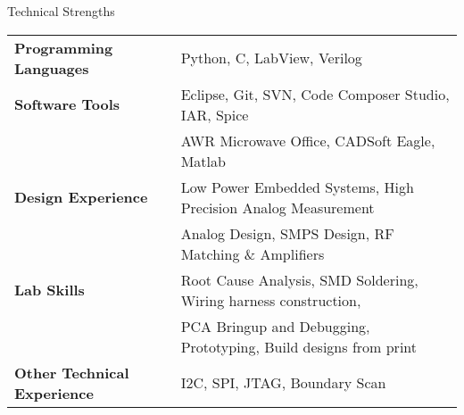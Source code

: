 \documentclass{resume} %
\begin{document}
\begin{rSection}{Technical Strengths}

\begin{tabular}{ @{} >{\bfseries}l @{\hspace{6ex}} l }
Programming Languages & Python, C, LabView, Verilog \smallskip \\

Software Tools & Eclipse, Git, SVN, Code Composer Studio, IAR, Spice\\ 
 & AWR Microwave Office, CADSoft Eagle, Matlab \smallskip \\

Design Experience & Low Power Embedded Systems, High Precision Analog Measurement \\ 
 & Analog Design, SMPS Design, RF Matching \& Amplifiers \smallskip \\
 
Lab Skills & Root Cause Analysis, SMD Soldering, Wiring harness construction,\\
 & PCA Bringup and Debugging, Prototyping, Build designs from print\smallskip \\
 
Other Technical Experience & I2C, SPI, JTAG, Boundary Scan \\
\end{tabular}

\end{rSection}
\medskip

\end{document}
